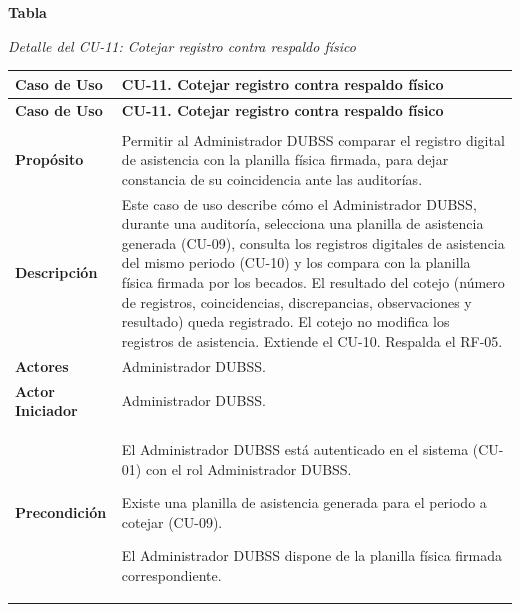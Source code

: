 \label{tab:detalle_cu11}
\noindent\textbf{Tabla~\thetable}\par\nopagebreak
\noindent\textit{Detalle del CU-11: Cotejar registro contra respaldo físico}\par\nopagebreak
\begingroup\small\linespread{1}\selectfont
\begin{longtable}{>{\raggedright\arraybackslash}p{2.9cm} >{\raggedright\arraybackslash}p{12.6cm}}
\toprule
\textbf{Caso de Uso} & \textbf{CU-11. Cotejar registro contra respaldo físico} \\
\midrule
\endfirsthead
\toprule
\textbf{Caso de Uso} & \textbf{CU-11. Cotejar registro contra respaldo físico} \\
\midrule
\endhead
\endfoot
\bottomrule
\multicolumn{2}{l}{\textit{Nota.} Elaboración propia.} \\
\endlastfoot
\textbf{Propósito} & Permitir al Administrador DUBSS comparar el registro digital de asistencia con la planilla física firmada, para dejar constancia de su coincidencia ante las auditorías. \\
\midrule
\textbf{Descripción} & Este caso de uso describe cómo el Administrador DUBSS, durante una auditoría, selecciona una planilla de asistencia generada (CU-09), consulta los registros digitales de asistencia del mismo periodo (CU-10) y los compara con la planilla física firmada por los becados. El resultado del cotejo (número de registros, coincidencias, discrepancias, observaciones y resultado) queda registrado. El cotejo no modifica los registros de asistencia. Extiende el CU-10. Respalda el RF-05. \\
\midrule
\textbf{Actores} & Administrador DUBSS. \\
\midrule
\textbf{Actor Iniciador} & Administrador DUBSS. \\
\midrule
\textbf{Precondición} & \vspace{-\baselineskip}\begin{cuvin}
    \item El Administrador DUBSS está autenticado en el sistema (CU-01) con el rol Administrador DUBSS.
    \item Existe una planilla de asistencia generada para el periodo a cotejar (CU-09).
    \item El Administrador DUBSS dispone de la planilla física firmada correspondiente.
\end{cuvin} \\

\end{longtable}
